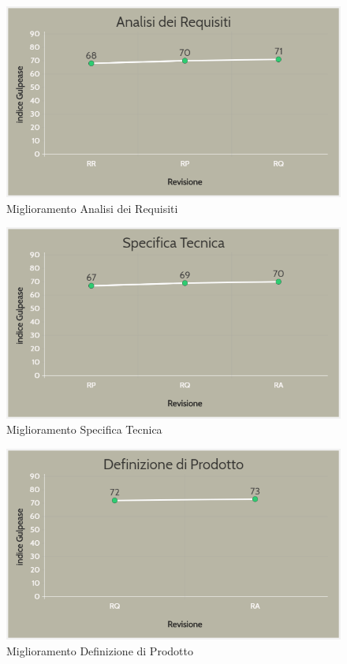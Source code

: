 \begin{figure}[H]
	\centering
	\includegraphics[scale=0.6]{includes/img/AdR.png}
	\caption{Miglioramento Analisi dei Requisiti}
\end{figure}

\begin{figure}[H]
	\centering
	\includegraphics[scale=0.6]{includes/img/ST.png}
	\caption{Miglioramento Specifica Tecnica}
\end{figure}

\begin{figure}[H]
	\centering
	\includegraphics[scale=0.6]{includes/img/DDP.png}
	\caption{Miglioramento Definizione di Prodotto}
\end{figure}

